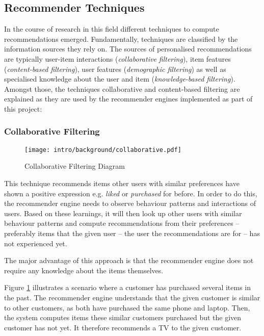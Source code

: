 \subsection{Recommender Techniques}
\label{intro-bg-tech}

In the course of research in this field different techniques to compute recommendations emerged. Fundamentally, techniques are classified by the information sources they rely on. The sources of personalised recommendations are typically user-item interactions (\emph{collaborative filtering}), item features (\emph{content-based filtering}), user features (\emph{demographic filtering}) as well as specialised knowledge about the user and item (\emph{knowledge-based filtering}).  Amongst those, the techniques collaborative and content-based filtering are explained as they are used by the recommender engines implemented as part of this project:

\subsubsection{Collaborative Filtering}
\label{intro-bg-tech-collaborative}

\begin{figure}[ht]
    \texttt{[image: intro/background/collaborative.pdf]}
    \caption{Collaborative Filtering Diagram}
    \label{fig:intro-techniques-collaborative}
\end{figure}

This technique recommends items other users with similar preferences have shown a positive expression e.g. \emph{liked} or \emph{purchased} for before. In order to do this, the recommender engine needs to observe behaviour patterns and interactions of users. Based on these learnings, it will then look up other users with similar behaviour patterns and compute recommendations from their preferences -- preferably items that the given user -- the user the recommendations are for -- has not experienced yet.

The major advantage of this approach is that the recommender engine does not require any knowledge about the items themselves.

Figure \ref{fig:intro-techniques-collaborative} illustrates a scenario where a customer has purchased several items in the past. The recommender engine understands that the given customer is similar to other customers, as both have purchased the same phone and laptop. Then, the system computes items these similar customers purchased but the given customer has not yet. It therefore recommends a TV to the given customer.

